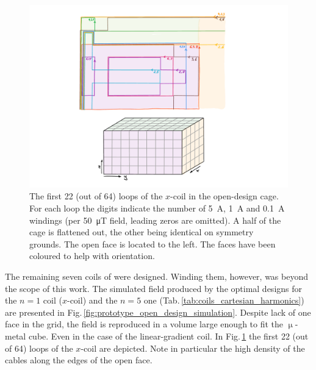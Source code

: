 \begin{figure}
  \centering
  \includegraphics[width=\linewidth]{gfx/prototype/open_design_Xcoil_coils.pdf}
  \caption{The first 22 (out of 64) loops of the $x$-coil in the open-design cage. For each loop the digits indicate the number of \SI{5}{\ampere}, \SI{1}{\ampere} and \SI{0.1}{\ampere} windings (per \SI{50}{\micro\tesla} field, leading zeros are omitted). A half of the cage is flattened out, the other being identical on symmetry grounds. The open face is located to the left. The faces have been coloured to help with orientation.}\label{fig:prototype_open_design_Xcoil_coils}
\end{figure}

The remaining seven coils of were designed. Winding them, however, was beyond the scope of this work.
The simulated field produced by the optimal designs for the $n = 1$ coil ($x$-coil) and the $n = 5$ one (Tab.\,\ref{tab:coils_cartesian_harmonics}) are presented in Fig.\,\ref{fig:prototype_open_design_simulation}.
Despite lack of one face in the grid, the field is reproduced in a volume large enough to fit the $\upmu$-metal cube. Even in the case of the linear-gradient coil. In Fig.\,\ref{fig:prototype_open_design_Xcoil_coils} the first 22 (out of 64) loops of the $x$-coil are depicted.
Note in particular the high density of the cables along the edges of the open face.

